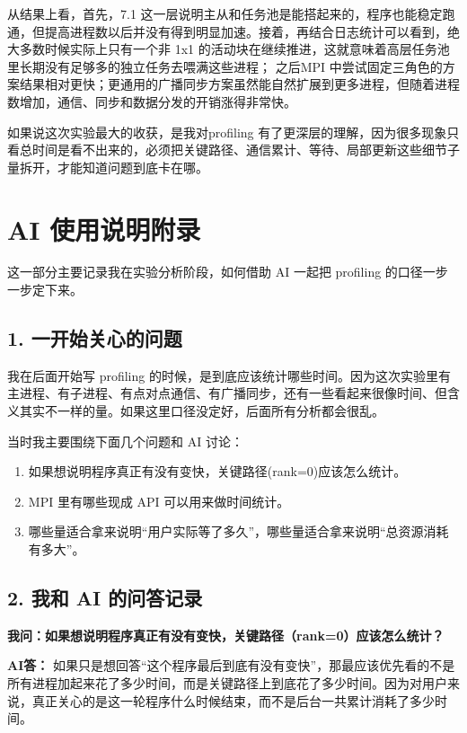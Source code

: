 \documentclass[12pt,a4paper,fontset=none]{ctexart}
\begin{document}
  从结果上看，首先，7.1 这一层说明主从和任务池是能搭起来的，程序也能稳定跑通，但提高进程数以后并没有得到明显加速。接着，再结合日志统计可以看到，绝大多数时候实际上只有一个非 1x1 的活动块在继续推进，这就意味着高层任务池里长期没有足够多的独立任务去喂满这些进程； 之后MPI 中尝试固定三角色的方案结果相对更快；更通用的广播同步方案虽然能自然扩展到更多进程，但随着进程数增加，通信、同步和数据分发的开销涨得非常快。

  如果说这次实验最大的收获，是我对profiling 有了更深层的理解，因为很多现象只看总时间是看不出来的，必须把关键路径、通信累计、等待、局部更新这些细节子量拆开，才能知道问题到底卡在哪。

\newpage
\appendix
\section{AI 使用说明附录}
这一部分主要记录我在实验分析阶段，如何借助 AI 一起把 profiling 的口径一步一步定下来。

\subsection{1. 一开始关心的问题}

我在后面开始写 profiling 的时候，是到底应该统计哪些时间。因为这次实验里有主进程、有子进程、有点对点通信、有广播同步，还有一些看起来很像时间、但含义其实不一样的量。如果这里口径没定好，后面所有分析都会很乱。

当时我主要围绕下面几个问题和 AI 讨论：
\begin{enumerate}
    \item 如果想说明程序真正有没有变快，关键路径(rank=0)应该怎么统计。
    \item MPI 里有哪些现成 API 可以用来做时间统计。
    \item 哪些量适合拿来说明“用户实际等了多久”，哪些量适合拿来说明“总资源消耗有多大”。
\end{enumerate}

\subsection{2. 我和 AI 的问答记录}

\textbf{我问：如果想说明程序真正有没有变快，关键路径（rank=0）应该怎么统计？}

\textbf{AI答：} 如果只是想回答“这个程序最后到底有没有变快”，那最应该优先看的不是所有进程加起来花了多少时间，而是关键路径上到底花了多少时间。因为对用户来说，真正关心的是这一轮程序什么时候结束，而不是后台一共累计消耗了多少时间。
\end{document}
